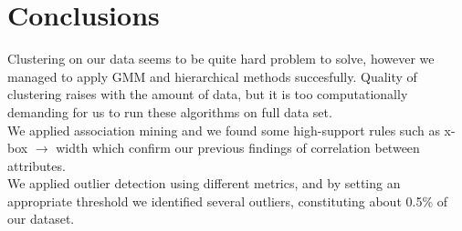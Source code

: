 \chapter*{Conclusions}
Clustering on our data seems to be quite hard problem to solve, however we managed to apply  GMM and hierarchical methods succesfully. Quality of clustering raises with the amount of data, but it is too computationally demanding for us to run these algorithms on full data set. \\

\noindent We applied association mining and we found some high-support rules such as  x-box $\rightarrow$ width  which confirm our previous findings of correlation between attributes.\\

\noindent We applied outlier detection using different metrics, and by setting an appropriate threshold we identified several outliers, constituting about 0.5\% of our dataset. 